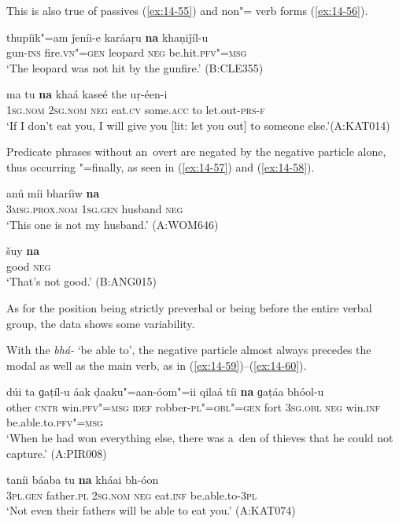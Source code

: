 This is also true of passives (\ref{ex:14-55}) and non"= verb forms (\ref{ex:14-56}).

\begin{exe}
\ex
\label{ex:14-55}
\gll thupíik"=am ǰeníi-e karáaṛu \textbf{na} khaṇiǰíl-u \\
gun-\textsc{ins} fire.\textsc{vn"=gen} leopard \textsc{neg} be.hit.\textsc{pfv"=msg}  \\
\glt `The leopard was not hit by the gunfire.' (B:CLE355)

\ex
\label{ex:14-56}
\gll ma tu \textbf{na} khaá kaseé the uṛ-éen-i \\
\textsc{1sg.nom} \textsc{2sg.nom} \textsc{neg} eat.\textsc{cv} some.\textsc{acc} to let.out-\textsc{prs-f} \\
\glt `If I don't eat you, I will give you [lit: let you out] to someone else.'\newline (A:KAT014)
\end{exe}

Predicate  phrases without an~overt  are negated by the negative particle alone, thus occurring "=finally, as seen in (\ref{ex:14-57}) and (\ref{ex:14-58}).

\begin{exe}
\ex
\label{ex:14-57}
\gll anú míi bharíiw \textbf{na} \\
\textsc{3msg.prox.nom} \textsc{1sg.gen} husband \textsc{neg} \\
\glt `This one is not my husband.' (A:WOM646)

\ex
\label{ex:14-58}
\gll šuy \textbf{na} \\
good \textsc{neg} \\
\glt `That's not good.' (B:ANG015)
\end{exe}

As for the position being strictly preverbal or being before the entire verbal group, the data shows some variability. 


With the  \textit{bhá-} `be able to', the negative particle almost always precedes the modal as well as the main verb, as in (\ref{ex:14-59})--(\ref{ex:14-60}).

\begin{exe}
\ex
\label{ex:14-59}
\gll dúi ta ɡaṭíl-u áak ḍaaku"=aan-óom"=ii qilaá tíi \textbf{na} ɡaṭáa bhóol-u \\
other \textsc{cntr} win.\textsc{pfv"=msg} \textsc{idef} robber-\textsc{pl"=obl"=gen} fort  \textsc{3sg.obl} \textsc{neg} win.\textsc{inf} be.able.to.\textsc{pfv"=msg}  \\
\glt `When he had won everything else, there was a~den of thieves that he could not capture.' (A:PIR008)

\ex
\label{ex:14-60}
\gll taníi báaba tu \textbf{na} kháai bh-óon \\
\textsc{3pl.gen} father.\textsc{pl} \textsc{2sg.nom} \textsc{neg} eat.\textsc{inf} be.able.to-\textsc{3pl} \\
\glt `Not even their fathers will be able to eat you.' (A:KAT074)
\end{exe}

